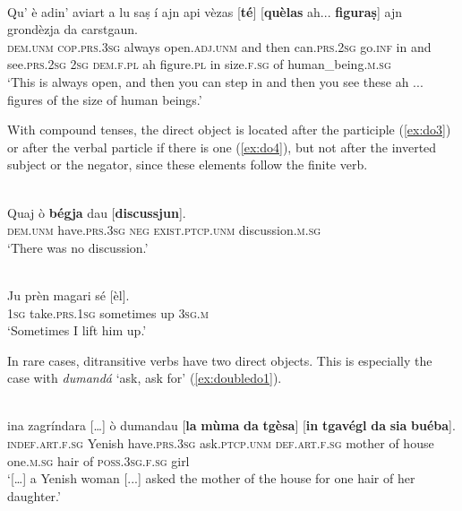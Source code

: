 \ea\label{ex:do2}
\\
\gll  Qu’ è adin' aviart a lu saṣ í ajn api vèzas [\textbf{té}] [\textbf{quèlas} ah... \textbf{figuraṣ}] ajn grondèzja da carstgaun.\\
\textsc{dem.unm} \textsc{cop.prs.3sg} always open.\textsc{adj.unm} and then can.\textsc{prs.2sg} go.\textsc{inf} in and see.\textsc{prs.2sg} \textsc{2sg} \textsc{dem.f.pl} ah figure.\textsc{pl} in size.\textsc{f.sg} of human\_being.\textsc{m.sg} \\
\glt `This is always open, and then you can step in and then you see these ah ... figures of the size of human beings.'
\z

With compound tenses, the direct object is located after the participle (\ref{ex:do3}) or after the verbal particle if there is one (\ref{ex:do4}), but not after the inverted subject or the negator, since these elements follow the finite verb.

\ea\label{ex:do3}
\\
\gll    Quaj ò \textbf{bégja} dau [\textbf{discussjun}].\\
\textsc{dem.unm} have.\textsc{prs.3sg} \textsc{neg} \textsc{exist.ptcp.unm} discussion.\textsc{m.sg}\\
\glt `There was no discussion.'
\z

\ea
\label{ex:do4}
\\
\gll  Ju prèn magari sé [èl].  \\
\textsc{1sg} take.\textsc{prs.1sg} sometimes up \textsc{3sg.m}\\
\glt `Sometimes I lift him up.'
\z

In rare cases, ditransitive verbs have two direct objects. This is especially the case with \textit{dumandá} `ask, ask for' (\ref{ex:doubledo1}).

\ea
\label{ex:doubledo1}
 {\citealt[131]{Büchli1966}}\\
\gll  [...]  ina zagríndara […] ò dumandau [\textbf{la} \textbf{mùma} \textbf{da} \textbf{tgèsa}] [\textbf{in} \textbf{tgavégl} \textbf{da} \textbf{sia} \textbf{buéba}]. \\
{} \textsc{indef.art.f.sg} Yenish {} have.\textsc{prs.3sg}   ask.\textsc{ptcp.unm} \textsc{def.art.f.sg} mother of house one.\textsc{m.sg} hair of \textsc{poss.3sg.f.sg} girl \\
\glt `[…] a Yenish woman [...] asked the mother of the house for one hair of her daughter.'
\z

